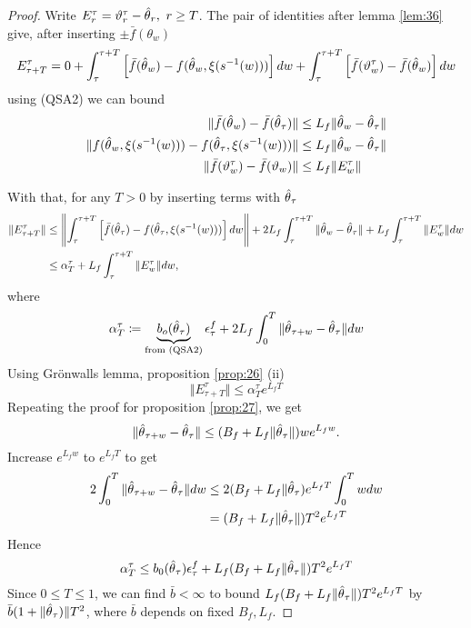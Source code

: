\begin{proof}
    Write \(E_r^\tau=\vartheta_r^\tau-{\hat{\theta}}_r,\ r\geq T\). The pair of
    identities after lemma \ref{lem:36} give, after inserting \(\pm \bar{f}(\theta_w)\) 
    \begin{align*}
        E_{\tau+T}^\tau=0+\int_\tau^{\tau+T}\left[\bar{f}({\hat{\theta}}_w)-f({\hat{\theta}}_w,\xi(s^{-1}(w)))\right]dw+\int_\tau^{\tau+T}\left[\bar{f}(\vartheta_w^\tau)-\bar{f}({\hat{\theta}}_w)\right]dw
    \end{align*} 
    using (QSA2) we can bound 
    \begin{align*}
        \Vert \bar{f}({\hat{\theta}}_w)-\bar{f}({\hat{\theta}}_\tau)\Vert &\leq L_f\Vert {\hat{\theta}}_w-{\hat{\theta}}_\tau\Vert\\
        \Vert f({\hat{\theta}}_w,\xi(s^{-1}(w)))-f({\hat{\theta}}_\tau,\xi(s^{-1}(w)))\Vert &\leq L_f\Vert {\hat{\theta}}_w-{\hat{\theta}}_\tau\Vert \\
        \Vert \bar{f}(\vartheta_w^\tau)-\bar{f}(\vartheta_w)\Vert &\leq L_f\Vert E_w^\tau\Vert 
    \end{align*}

    With that, for any \(T>0\) by inserting terms with \({\hat{\theta}}_\tau\)
    \begin{align*}
        \Vert E_{\tau+T}^\tau\Vert &\leq \left\Vert \int_{\tau}^{\tau+T}\left[\bar{f}({\hat{\theta}}_\tau)-f({\hat{\theta}}_\tau,\xi(s^{-1}(w)))\right]dw\right\Vert + 2L_f\int_{\tau}^{\tau+T}\Vert {\hat{\theta}}_w-{\hat{\theta}}_\tau\Vert+L_f\int_{\tau}^{\tau+T}\Vert E_w^\tau\Vert dw\\
        &\leq \alpha_T^\tau+ L_f \int_{\tau}^{\tau+T}\Vert E_w^\tau\Vert dw,
    \end{align*}
    where
    \[\alpha_T^\tau\coloneqq \underbrace{b_o({\hat{\theta}}_\tau)}_{\text{from (QSA2)}}\epsilon_\tau^f+2L_f\int_0^T\Vert {\hat{\theta}}_{\tau+w}-{\hat{\theta}}_\tau\Vert dw\]
    Using Grönwalls lemma, proposition \ref{prop:26} (ii) \[\Vert E_{\tau+T}^\tau\Vert\leq \alpha_T^\tau e^{L_f T}\]
    Repeating the proof for proposition \ref{prop:27}, we get 
    \[\Vert {\hat{\theta}}_{\tau+w}-{\hat{\theta}}_\tau\Vert \leq (B_f+L_f\Vert {\hat{\theta}}_\tau\Vert)we^{L_f w}.\]
    Increase \(e^{L_f w}\) to \(e^{L_f T}\) to get 
    \begin{align*}
        2\int_{0}^T\Vert {\hat{\theta}}_{\tau+w}-{\hat{\theta}}_\tau\Vert dw&\leq 2 (B_f + L_f\Vert {\hat{\theta}}_\tau)e^{L_f T}\int_0^T w dw\\
        &=(B_f+L_f\Vert{\hat{\theta}}_\tau\Vert)T^2 e^{L_f T}
    \end{align*}
    Hence 
    \[\alpha_T^\tau\leq b_0({\hat{\theta}}_\tau)\epsilon_\tau^f+L_f(B_f+L_f\Vert{\hat{\theta}}_\tau\Vert)T^2 e^{L_f T}\]
    Since \(0\leq T\leq 1\), we can find \(\bar{b}<\infty\) to bound \(L_f(B_f+L_f\Vert{\hat{\theta}}_\tau\Vert)T^2 e^{L_f T}\)
    by \(\bar{b}(1+\Vert {\hat{\theta}}_\tau)\Vert T^2\), where \(\bar{b}\) depends on fixed \(B_f,L_f\).
\end{proof}

